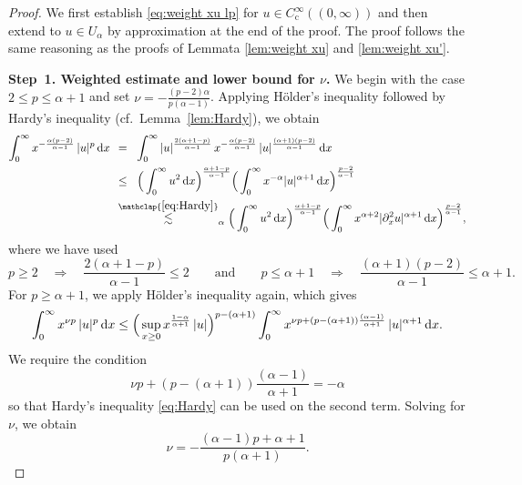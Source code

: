 \documentclass[reqno,12pt]{amsart}
\renewcommand{\d}{\ensuremath{\mathrm{d}}}
\renewcommand{\d}{\ensuremath{{\rm d}}}
\numberwithin{equation}{section}
\begin{document}
\begin{proof}
We first establish \eqref{eq:weight xu lp} for $u \in C^\infty_\mathrm{c}((0,\infty))$
and then extend to $u \in U_\alpha$ by approximation at the end of the proof. The proof follows the same reasoning as the proofs of Lemmata \ref{lem:weight xu} and \ref{lem:weight xu'}.

%
\bigskip
%

\noindent\textbf{Step~1. Weighted estimate and lower bound for \(\nu\).}
%
We begin with the case $2\leq p \leq \alpha+1$ and set $\nu =- \frac{(p-2)\alpha}{p(\alpha-1)}$.
%
Applying H\"older’s inequality followed by Hardy’s inequality (cf.~Lemma~\ref{lem:Hardy}), we obtain
%
\begin{align}
\int_0^\infty x^{- \frac{\alpha (p-2)}{\alpha-1}} \, |u|^p \, \d x 
\;\, &=_{\phantom\alpha} \int_0^\infty |u|^{\frac{2(\alpha +1 -p)}{\alpha-1}} \, x^{- \frac{\alpha (p-2)}{\alpha-1}} \,|u|^{\frac{(\alpha+1)(p-2)}{\alpha-1}} \, \d x \nonumber \\
& \leq_{\phantom\alpha} \Big( \int_0^\infty u^2 \, \d x\Big)^{\frac{\alpha+1-p}{\alpha -1}} \Big( \int_0^\infty x^{-\alpha} | u|^{\alpha +1} \, \d x \Big)^{\frac{p-2}{\alpha-1}} \nonumber \\
& \stackrel{\mathclap{\eqref{eq:Hardy}}}{\lesssim}_{\alpha} \Big( \int_0^\infty u^2 \, \d x\Big)^{\frac{\alpha+1-p}{\alpha -1}} \Big( \int_0^\infty x^{\alpha+2} |\partial_x^2 u|^{\alpha +1} \, \d x \Big)^{\frac{p-2}{\alpha-1}}, \label{eq:weight xu lp1}
\end{align}
%
where we have used
%
\[
p \ge 2 \quad \Rightarrow \quad \frac{2(\alpha +1 -p)}{\alpha-1} \le 2 \qquad \text{and} \qquad p \le \alpha+1 \quad \Rightarrow \quad \frac{(\alpha+1)(p-2)}{\alpha-1} \le \alpha+1.
\]
%
For $p\geq \alpha +1$, we apply H\"older's inequality again, which gives
%
\begin{equation}\label{eq:weight xu lp2}
\int_0^\infty x^{\nu p} \, |u|^p \, \d x 
\leq   \Big( \sup_{x \ge 0} x^{ \frac{1-\alpha}{\alpha+1}} \, |u|\Big)^{p-(\alpha +1)} 
\int_0^\infty x^{\nu p + (p-(\alpha +1))\frac{(\alpha-1)}{\alpha+1} } \, |u|^{\alpha +1} \, \d x.
\end{equation}
%
We require the condition
%
\begin{equation*}
\nu p + (p-(\alpha +1))\frac{(\alpha-1)}{\alpha+1} = -\alpha
\end{equation*}
%
so that Hardy's inequality \eqref{eq:Hardy} can be used on the second term. Solving for $\nu$, we obtain
%
\begin{equation*}
\nu = - \frac{(\alpha -1) p + \alpha +1}{p(\alpha +1)}.

\end{equation*}
\end{proof}
\end{document}
